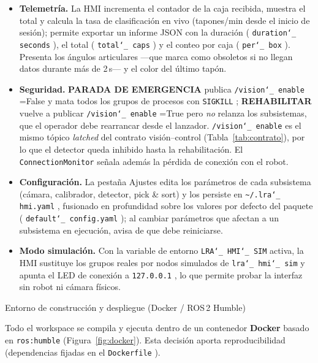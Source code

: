 \documentclass[12pt,a4paper]{article}
\makeatletter
\newcommand{\subsecfmt}[1]{%
  {\large\bfseries\color{MediumBlue}#1}%
  \par\vspace{2pt}%
}
\renewcommand\subsection{%
  \@ifstar\subsection@star\subsection@nostar
}
\newcommand\subsection@nostar[1]{%
  \refstepcounter{subsection}%
  \addcontentsline{toc}{subsection}{\protect\numberline{\thesubsection}#1}%
  \vspace{10pt}%
  \subsecfmt{\thesubsection.\enspace #1}%
  \vspace{2pt}%
}
\newcommand\subsection@star[1]{%
  \vspace{10pt}\subsecfmt{#1}\vspace{2pt}%
}
\newcommand{\code}[1]{%
  \begingroup
  \def\_{\char`_\penalty0 }%
  \def\/{\char`/\penalty0 }%
  \texttt{\small #1}%
  \endgroup}
\makeatother
\begin{document}
\begin{itemize}
\item \textbf{Telemetría.} La HMI incrementa el contador de la caja recibida,
muestra el total y calcula la tasa de clasificación en vivo (tapones/min desde el
inicio de sesión); permite exportar un informe JSON con la duración
(\code{duration\_seconds}), el total (\code{total\_caps}) y el conteo por caja
(\code{per\_box}). Presenta los ángulos articulares —que marca como obsoletos si
no llegan datos durante más de 2\,s— y el color del último tapón.
\item \textbf{Seguridad.} \textbf{PARADA DE EMERGENCIA} publica
\code{/vision\_enable}=False y mata todos los grupos de procesos con
\code{SIGKILL}; \textbf{REHABILITAR} vuelve a publicar \code{/vision\_enable}=True
pero \emph{no} relanza los subsistemas, que el operador debe rearrancar desde el
lanzador. \code{/vision\_enable} es el mismo tópico \textit{latched} del contrato
visión--control (Tabla~\ref{tab:contrato}), por lo que el detector queda inhibido
hasta la rehabilitación. El \code{ConnectionMonitor} señala además la pérdida de
conexión con el robot.
\item \textbf{Configuración.} La pestaña Ajustes edita los
parámetros de cada subsistema (cámara, calibrador, detector, pick \& sort) y los
persiste en \code{\textasciitilde/.lra\_hmi.yaml}, fusionado en profundidad sobre
los valores por defecto del paquete (\code{default\_config.yaml}); al cambiar
parámetros que afectan a un subsistema en ejecución, avisa de que debe reiniciarse.
\item \textbf{Modo simulación.} Con la variable de entorno \code{LRA\_HMI\_SIM}
activa, la HMI sustituye los grupos reales por nodos simulados de
\code{lra\_hmi\_sim} y apunta el LED de conexión a \code{127.0.0.1}, lo que permite
probar la interfaz sin robot ni cámara físicos.
\end{itemize}

\clearpage
\subsection{Entorno de construcción y despliegue (Docker / ROS\,2 Humble)}
\label{sec:docker}

Todo el workspace se compila y ejecuta dentro de un contenedor
\textbf{Docker} basado en \code{ros:humble} (Figura~\ref{fig:docker}). Esta
decisión aporta reproducibilidad (dependencias fijadas en el
\code{Dockerfile}).
\end{document}
